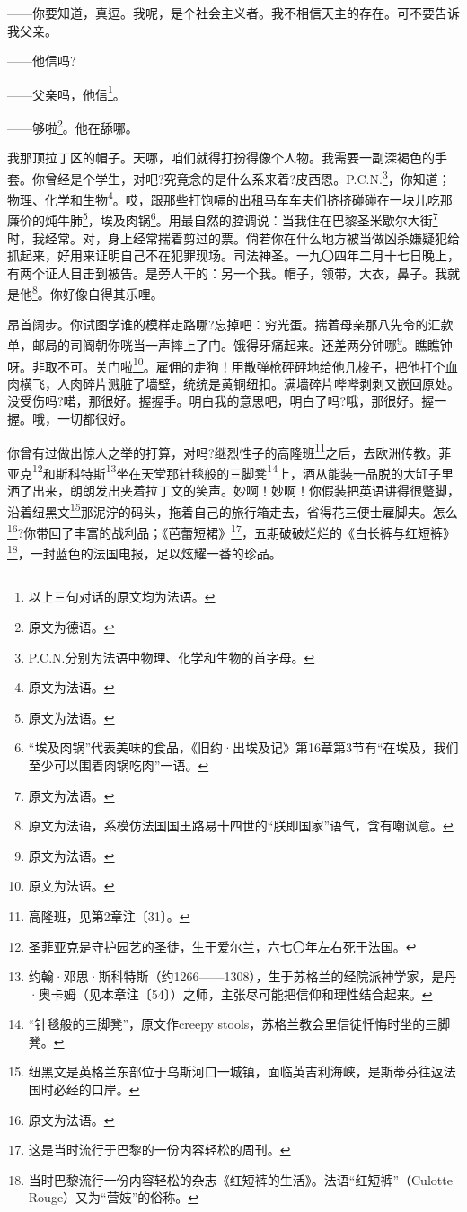 \par ——你要知道，真逗。我呢，是个社会主义者。我不相信天主的存在。可不要告诉我父亲。
\par ——他信吗?
\par ——父亲吗，他信\footnote{以上三句对话的原文均为法语。}。
\par ——够啦\footnote{原文为德语。}。他在舔哪。
\par 我那顶拉丁区的帽子。天哪，咱们就得打扮得像个人物。我需要一副深褐色的手套。你曾经是个学生，对吧?究竟念的是什么系来着?皮西恩。P.C.N.\footnote{P.C.N.分别为法语中物理、化学和生物的首字母。}，你知道；物理、化学和生物\footnote{原文为法语。}。哎，跟那些打饱嗝的出租马车车夫们挤挤碰碰在一块儿吃那廉价的炖牛肺\footnote{原文为法语。}，埃及肉锅\footnote{“埃及肉锅”代表美味的食品，《旧约·出埃及记》第16章第3节有“在埃及，我们至少可以围着肉锅吃肉”一语。}。用最自然的腔调说：当我住在巴黎圣米歇尔大街\footnote{原文为法语。}时，我经常。对，身上经常揣着剪过的票。倘若你在什么地方被当做凶杀嫌疑犯给抓起来，好用来证明自己不在犯罪现场。司法神圣。一九〇四年二月十七日晚上，有两个证人目击到被告。是旁人干的：另一个我。帽子，领带，大衣，鼻子。我就是他\footnote{原文为法语，系模仿法国国王路易十四世的“朕即国家”语气，含有嘲讽意。}。你好像自得其乐哩。
\par 昂首阔步。你试图学谁的模样走路哪?忘掉吧：穷光蛋。揣着母亲那八先令的汇款单，邮局的司阍朝你咣当一声摔上了门。饿得牙痛起来。还差两分钟哪\footnote{原文为法语。}。瞧瞧钟呀。非取不可。关门啦\footnote{原文为法语。}。雇佣的走狗！用散弹枪砰砰地给他几梭子，把他打个血肉横飞，人肉碎片溅脏了墙壁，统统是黄铜纽扣。满墙碎片哔哔剥剥又嵌回原处。没受伤吗?喏，那很好。握握手。明白我的意思吧，明白了吗?哦，那很好。握一握。哦，一切都很好。
\par 你曾有过做出惊人之举的打算，对吗?继烈性子的高隆班\footnote{高隆班，见第2章注〔31〕。}之后，去欧洲传教。菲亚克\footnote{圣菲亚克是守护园艺的圣徒，生于爱尔兰，六七〇年左右死于法国。}和斯科特斯\footnote{约翰·邓思·斯科特斯（约1266——1308），生于苏格兰的经院派神学家，是丹·奥卡姆（见本章注〔54〕）之师，主张尽可能把信仰和理性结合起来。}坐在天堂那针毯般的三脚凳\footnote{“针毯般的三脚凳”，原文作creepy stools，苏格兰教会里信徒忏悔时坐的三脚凳。}上，酒从能装一品脱的大缸子里洒了出来，朗朗发出夹着拉丁文的笑声。妙啊！妙啊！你假装把英语讲得很蹩脚，沿着纽黑文\footnote{纽黑文是英格兰东部位于乌斯河口一城镇，面临英吉利海峡，是斯蒂芬往返法国时必经的口岸。}那泥泞的码头，拖着自己的旅行箱走去，省得花三便士雇脚夫。怎么\footnote{原文为法语。}?你带回了丰富的战利品；《芭蕾短裙》\footnote{这是当时流行于巴黎的一份内容轻松的周刊。}，五期破破烂烂的《白长裤与红短裤》\footnote{当时巴黎流行一份内容轻松的杂志《红短裤的生活》。法语“红短裤”（Culotte Rouge）又为“营妓”的俗称。}，一封蓝色的法国电报，足以炫耀一番的珍品。
